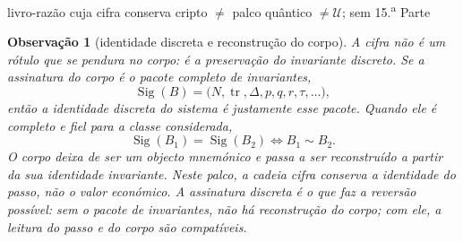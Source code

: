 \documentclass[11pt,a4paper]{article}
\newcommand{\code}[1]{\texttt{\small #1}}
\providecommand{\interfacen}[1]{}
\newtheorem{observacao}[teorema]{Observação}
\begin{document}
\interfacen{6}
       {livro-razão cuja cifra conserva}
       {cripto $\neq$ palco quântico $\neq\mathcal{U}$; sem 15.\textsuperscript{a} Parte}
\maketitle

\begin{abstract}\noindent
A \textbf{Cadeia de Cristais (CristalChain)} \textbf{já estava construída}
no catálogo: um livro-razão cuja cifra conserva. Este paper \textbf{não}
inventa a cadeia, \textbf{não} a promove a blockchain, \textbf{não} a
funde com Born, Duo, Lei~8 nem com $A_0$ dourada. Resgata o enunciado,
fecha os labels (\code{cripto:}\ldots) e marca \texttt{nao localizada}
o elo que o repositório não mede.
\[
\boxed{\;
\pi^{2}=\pi
\neq x^{2}=1
\neq x^{2}=x+1
\neq x^{2}=-1
\neq\operatorname{Star}(\mathcal{U})=\mathcal{D}
\;}
\]
A conservação da cadeia é $\det(B^{k})=+1$ no ouro branco
(\code{tests/ouro\_branco.c}) --- o sinal do determinante sob
composição, \textbf{não} um saldo económico.
$P=k/N$ é GLH (\code{fis:thm:central}).
Born é $p_i=\lvert\langle i\rvert\psi\rangle\rvert^{2}$.
Parseval do corpus cristal é isometria do jornal
(\code{tests/cristal\_energia.js}).
$\mathrm{sha256}$ selecciona identidade
(\code{univ:def:lei-local-canonica}), \textbf{não} é a cifra.
Quatro conservações; não se fundem.
O fecho de $\mathcal{U}$ já está em
\code{univ:thm:composicao-fechos}; Born não o fecha.
\end{abstract}

\begin{observacao}[identidade discreta e reconstrução do corpo]
A cifra não é um rótulo que se pendura no corpo: é a preservação do invariante discreto.
Se a assinatura do corpo é o pacote completo de invariantes,
\[
\operatorname{Sig}(B)=\bigl(N,\operatorname{tr},\Delta,p,q,r,\tau,\ldots\bigr),
\]
então a identidade discreta do sistema é justamente esse pacote. Quando ele é completo e fiel
para a classe considerada,
\[
\operatorname{Sig}(B_1)=\operatorname{Sig}(B_2)
\iff
B_1\sim B_2.
\]
O corpo deixa de ser um objecto mnemónico e passa a ser reconstruído a partir da sua identidade
invariante. Neste palco, a cadeia cifra conserva a identidade do passo, não o valor económico.
A assinatura discreta é o que faz a reversão possível: sem o pacote de invariantes, não há
reconstrução do corpo; com ele, a leitura do passo e do corpo são compatíveis.
\end{observacao}
\end{document}
